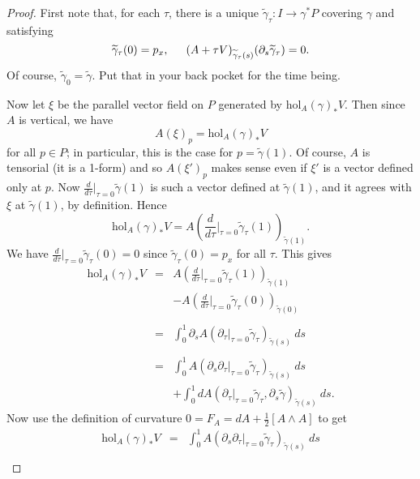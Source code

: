 \documentclass{article}
\newcommand{\intdd}[2]{\displaystyle \int_{#1}^{#2}}
\newcommand{\hol}{{\mathrm{hol}}}
\begin{document}
\begin{proof}
First note that, for each $\tau$, there is a unique $\widetilde{\gamma}_\tau: I \rightarrow \gamma^* P$ covering $\gamma$ and satisfying
\begin{equation}\label{a}
\widetilde{\gamma}_\tau(0) = p_x, \indent (A+ \tau V)_{\widetilde{\gamma}_\tau(s)}(\partial_s \widetilde{\gamma}_\tau) = 0.
\end{equation}
Of course, $\widetilde{\gamma}_0 = \widetilde{\gamma}$. Put that in your back pocket for the time being. 

Now let $\xi$ be the parallel vector field on $P$ generated by $\hol_A(\gamma)_* V $. Then since $A$ is vertical, we have
$$A(\xi)_p = \hol_A(\gamma)_* V $$
for all $p \in P$; in particular, this is the case for $p = \widetilde{\gamma}(1)$. Of course, $A$ is tensorial (it is a 1-form) and so $A(\xi')_p$ makes sense even if $\xi'$ is a vector defined only at $p$. Now $\frac{d}{d\tau} \vert_{\tau = 0} \widetilde{\gamma}(1)$ is such a vector defined at $\widetilde{\gamma}(1)$, and it agrees with $\xi$ at $\widetilde{\gamma}(1)$, by definition. Hence
$$\hol_A(\gamma)_*V = A\left( \frac{d}{d\tau} \vert_{\tau = 0} \widetilde{\gamma}_\tau(1) \right)_{\widetilde{\gamma}(1)}.$$
We have $\frac{d}{d\tau} \vert_{\tau = 0} \widetilde{\gamma}_\tau(0) = 0$ since $\widetilde{\gamma}_\tau(0) = p_x$ for all $\tau$. This gives
$$\begin{array}{rcl}
\hol_A(\gamma)_*V  & = & A\left( \frac{d}{d\tau} \vert_{\tau = 0} \widetilde{\gamma}_\tau(1) \right)_{\widetilde{\gamma}(1)}\\
&& - A\left( \frac{d}{d\tau} \vert_{\tau = 0} \widetilde{\gamma}_\tau(0) \right)_{\widetilde{\gamma}(0)}\\
&&\\
& =& \intdd{0}{1} \partial_s A\left( \partial_\tau \vert_{\tau = 0} \widetilde{\gamma}_\tau\right)_{\widetilde{\gamma}(s)} \: ds\\
&&\\
& = & \intdd{0}{1} A\left( \partial_s  \partial_\tau \vert_{\tau = 0} \widetilde{\gamma}_\tau \right)_{\widetilde{\gamma}(s)} \: ds\\
&& + \intdd{0}{1} dA( \partial_\tau \vert_{\tau = 0} \widetilde{\gamma}_\tau , \partial_s \widetilde{\gamma} )_{\widetilde{\gamma}(s)} \: ds.
\end{array}$$
Now use the definition of curvature $0 = F_A = dA + \frac{1}{2}\left[ A \wedge A \right]$ to get
$$\begin{array}{rcl}
\hol_A(\gamma)_*V  & = & \intdd{0}{1} A\left( \partial_s  \partial_\tau \vert_{\tau = 0} \widetilde{\gamma}_\tau \right)_{\widetilde{\gamma}(s)} \: ds\\

\end{array}$$
\end{proof}
\end{document}
